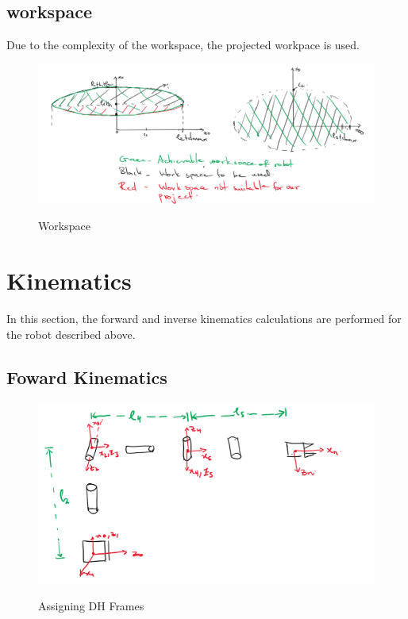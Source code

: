 \documentclass[12pt]{article}
\begin{document}
 \subsection{workspace}
 Due to the complexity of the workspace, the projected workpace is used.
 \begin{figure}[H]
    \centering
    \includegraphics[scale = 0.65]{workspace.PNG}\\[0.0 cm]	%
    \caption{Workspace}
 \end{figure}


 \section{Kinematics}
In this section, the forward and inverse kinematics calculations are  performed for the robot described above.
\subsection{Foward Kinematics}
\begin{figure}[H]
    \centering
    \includegraphics[scale = 0.7]{forward.png}\\[0.0 cm]	%
    \caption{Assigning DH Frames}
\end{figure}
\end{document}
